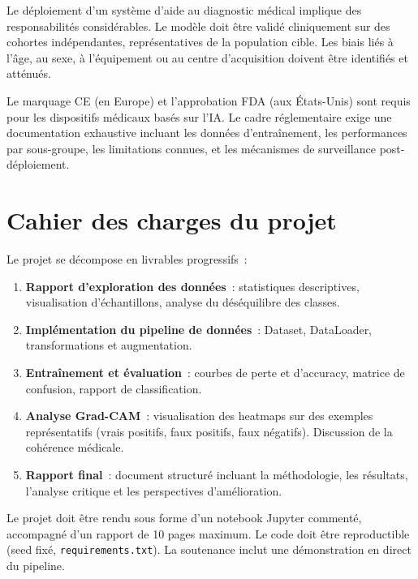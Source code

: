 \documentclass[a4paper,11pt,twoside]{book}
\begin{document}
Le déploiement d'un système d'aide au diagnostic médical implique des responsabilités considérables. Le modèle doit être validé cliniquement sur des cohortes indépendantes, représentatives de la population cible. Les biais liés à l'âge, au sexe, à l'équipement ou au centre d'acquisition doivent être identifiés et atténués.

Le marquage CE (en Europe) et l'approbation FDA (aux États-Unis) sont requis pour les dispositifs médicaux basés sur l'IA. Le cadre réglementaire exige une documentation exhaustive incluant les données d'entraînement, les performances par sous-groupe, les limitations connues, et les mécanismes de surveillance post-déploiement.

\section{Cahier des charges du projet}

Le projet se décompose en livrables progressifs~:

\begin{enumerate}[leftmargin=2em]
  \item \textbf{Rapport d'exploration des données}~: statistiques descriptives, visualisation d'échantillons, analyse du déséquilibre des classes.
  \item \textbf{Implémentation du pipeline de données}~: Dataset, DataLoader, transformations et augmentation.
  \item \textbf{Entraînement et évaluation}~: courbes de perte et d'accuracy, matrice de confusion, rapport de classification.
  \item \textbf{Analyse Grad-CAM}~: visualisation des heatmaps sur des exemples représentatifs (vrais positifs, faux positifs, faux négatifs). Discussion de la cohérence médicale.
  \item \textbf{Rapport final}~: document structuré incluant la méthodologie, les résultats, l'analyse critique et les perspectives d'amélioration.
\end{enumerate}

\begin{notebox}[Livrable]
Le projet doit être rendu sous forme d'un notebook Jupyter commenté, accompagné d'un rapport de 10 pages maximum. Le code doit être reproductible (seed fixé, \texttt{requirements.txt}). La soutenance inclut une démonstration en direct du pipeline.
\end{notebox}
\end{document}
